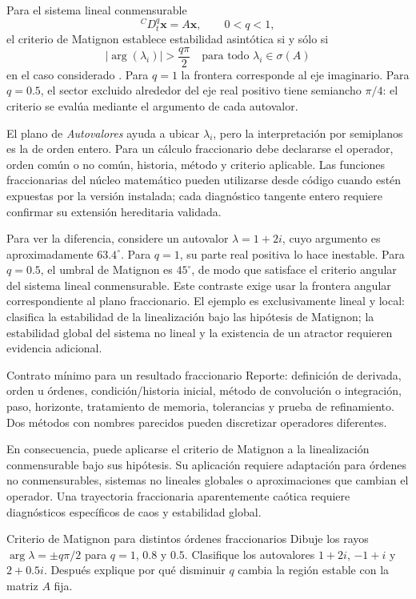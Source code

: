 \documentclass[11pt,a4paper]{article}
\newcommand{\gui}[1]{\textsf{\emph{#1}}}
\begin{document}
Para el sistema lineal conmensurable
\[
 {}^{C}D_t^q\mathbf{x}=A\mathbf{x},\qquad 0<q<1,
\]
el criterio de Matignon establece estabilidad asintótica si y sólo si
\[
 |\arg(\lambda_i)|>\frac{q\pi}{2}
 \quad\text{para todo }\lambda_i\in\sigma(A)
\]
en el caso considerado \cite{matignon1996}. Para $q=1$ la frontera corresponde al
eje imaginario. Para $q=0.5$, el sector excluido alrededor del eje real positivo
tiene semiancho $\pi/4$: el criterio se evalúa mediante el argumento de cada
autovalor.

El plano de \gui{Autovalores} ayuda a ubicar $\lambda_i$, pero la interpretación por
semiplanos es la de orden entero. Para un cálculo fraccionario debe declararse el
operador, orden común o no común, historia, método y criterio aplicable. Las funciones
fraccionarias del núcleo matemático pueden utilizarse desde código cuando estén
expuestas por la versión instalada; cada diagnóstico tangente entero requiere confirmar su extensión hereditaria validada.

Para ver la diferencia, considere un autovalor $\lambda=1+2i$, cuyo argumento es
aproximadamente $63.4^\circ$.
Para $q=1$, su parte real positiva lo hace inestable. Para $q=0.5$, el umbral de
Matignon es $45^\circ$, de modo que satisface el criterio angular del sistema lineal
conmensurable. Este contraste exige usar la frontera angular correspondiente al plano fraccionario. El ejemplo es exclusivamente lineal y local:
clasifica la estabilidad de la linealización bajo las hipótesis de Matignon; la
estabilidad global del sistema no lineal y la existencia de un atractor requieren
evidencia adicional.

\begin{evidencebox}{Contrato mínimo para un resultado fraccionario}
Reporte: definición de derivada, orden u órdenes, condición/historia inicial, método
de convolución o integración, paso, horizonte, tratamiento de memoria, tolerancias y
prueba de refinamiento. Dos métodos con nombres parecidos pueden discretizar
operadores diferentes.
\end{evidencebox}

En consecuencia, puede aplicarse el criterio de Matignon a la linealización
conmensurable bajo sus
hipótesis. Su aplicación requiere adaptación para órdenes no conmensurables, sistemas no
lineales globales o aproximaciones que cambian el operador. Una trayectoria
fraccionaria aparentemente caótica requiere diagnósticos específicos de caos y estabilidad global.

\begin{activitybox}{Criterio de Matignon para distintos órdenes fraccionarios}
Dibuje los rayos $\arg\lambda=\pm q\pi/2$ para $q=1$, $0.8$ y $0.5$. Clasifique
los autovalores $1+2i$, $-1+i$ y $2+0.5i$. Después explique por qué disminuir
$q$ cambia la región estable con la matriz $A$ fija.
\end{activitybox}
\end{document}
